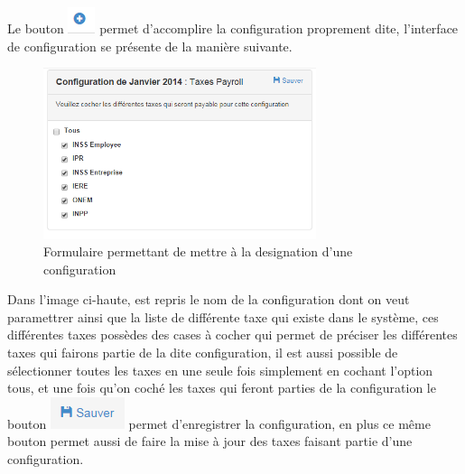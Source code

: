 \documentclass[12pt,a4paper]{report}
\begin{document}
Le bouton  \includegraphics[scale=0.7]{pic/PlusConfigBlue.png} permet d'accomplire la configuration proprement dite, l'interface de configuration se présente de la manière suivante.  
\begin{figure}[h]
\begin{center}
\includegraphics[width=8cm]{pic/ConfigTaxesMenu.png}
\end{center}
\caption{Formulaire permettant de mettre à la designation d'une configuration}
\label{Formulaire permettant de mettre à la designation d'une configuration}
\end{figure} 

Dans l'image ci-haute, est repris le nom de la configuration dont on veut paramettrer ainsi que la liste de différente taxe qui existe dans le système, ces différentes taxes possèdes des cases à cocher qui permet de préciser les différentes taxes qui fairons partie de la dite configuration, il est aussi possible de sélectionner toutes les taxes en une seule fois simplement en cochant l'option tous, et une fois qu'on coché les taxes qui feront parties de la configuration le bouton \includegraphics[scale=0.7]{pic/SaveConfig.png} permet d'enregistrer la configuration, en plus ce même bouton permet aussi de faire la mise à jour des taxes faisant partie d'une configuration.

\newpage
\end{document}
